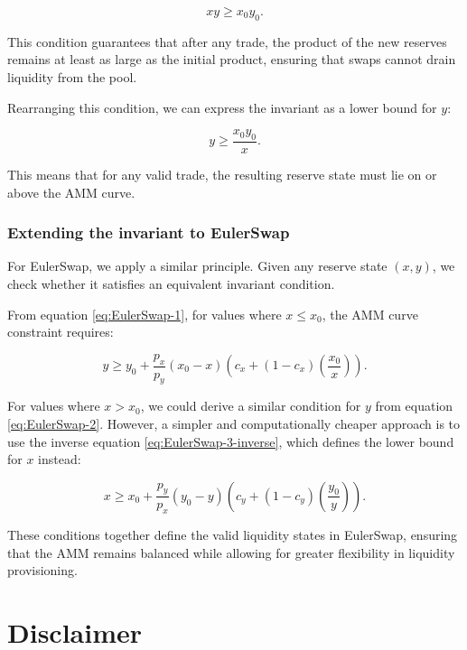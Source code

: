 \documentclass{article}
\begin{document}
\begin{equation}
    xy \geq x_0 y_0.
\end{equation}

This condition guarantees that after any trade, the product of the new reserves remains at least as large as the initial product, ensuring that swaps cannot drain liquidity from the pool.

Rearranging this condition, we can express the invariant as a lower bound for $y$:

\begin{equation}
    y \geq \frac{x_0 y_0}{x}.
\end{equation}

This means that for any valid trade, the resulting reserve state must lie on or above the AMM curve.  

\subsubsection{Extending the invariant to EulerSwap}

For EulerSwap, we apply a similar principle. Given any reserve state $(x, y)$, we check whether it satisfies an equivalent invariant condition.

From equation \eqref{eq:EulerSwap-1}, for values where \( x \leq x_0 \), the AMM curve constraint requires:

\begin{equation}
    \label{eq:invariant-x1}
    y \geq y_{0}+\frac{p_{x}}{p_{y}}\left(x_{0}-x\right)\left(c_{x}+\left(1-c_{x}\right)\left(\frac{x_{0}}{x}\right)\right).
\end{equation}

For values where \( x > x_0 \), we could derive a similar condition for $y$ from equation \eqref{eq:EulerSwap-2}. However, a simpler and computationally cheaper approach is to use the inverse equation \eqref{eq:EulerSwap-3-inverse}, which defines the lower bound for $x$ instead:

\begin{equation}
    \label{eq:invariant-x2}
    x \geq x_{0}+\frac{p_{y}}{p_{x}}\left(y_{0}-y\right)\left(c_{y}+\left(1-c_{y}\right)\left(\frac{y_{0}}{y}\right)\right).
\end{equation}

These conditions together define the valid liquidity states in EulerSwap, ensuring that the AMM remains balanced while allowing for greater flexibility in liquidity provisioning.

\section{Disclaimer}
\end{document}
